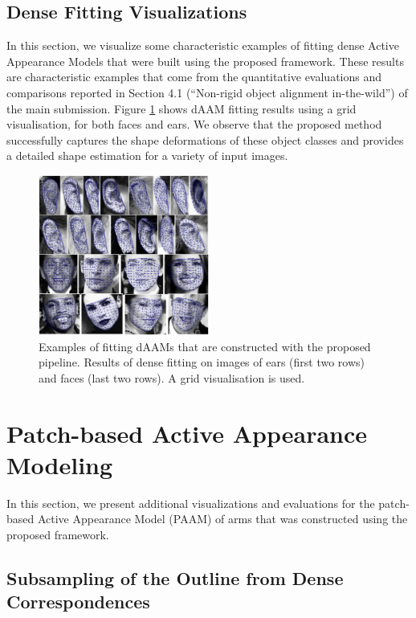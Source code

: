 \subsection{Dense Fitting Visualizations}
\label{sec:daam_fittingresults}


In this section,
we visualize some characteristic examples of fitting
dense Active Appearance Models that were built using the proposed framework.
These results are characteristic examples that come from the quantitative evaluations and comparisons reported in Section 4.1 (``Non-rigid object alignment in-the-wild'') of the main submission. Figure \ref{fig:fr} shows dAAM fitting results using a grid visualisation, for both faces and ears. We observe that the proposed method successfully captures the shape deformations of these object classes and provides a detailed shape estimation for a variety of input images.


\begin{figure}[!t]
\centering
\includegraphics[width=0.5\textwidth]{Suplementory_Meterial/Fittings/fittings}
\caption{Examples of fitting
dAAMs that are constructed with the proposed pipeline. Results of dense fitting on images of
 ears (first two rows) and faces (last two rows). A grid visualisation is used.}
\label{fig:fr}
\end{figure}




\section{Patch-based Active Appearance Modeling}
\label{sec:paam}

In this section, we present additional visualizations and evaluations for the patch-based Active Appearance Model (PAAM) of arms that was constructed using the proposed framework.

\subsection{Subsampling of the Outline from Dense Correspondences}
\label{sec:sparsesample}

